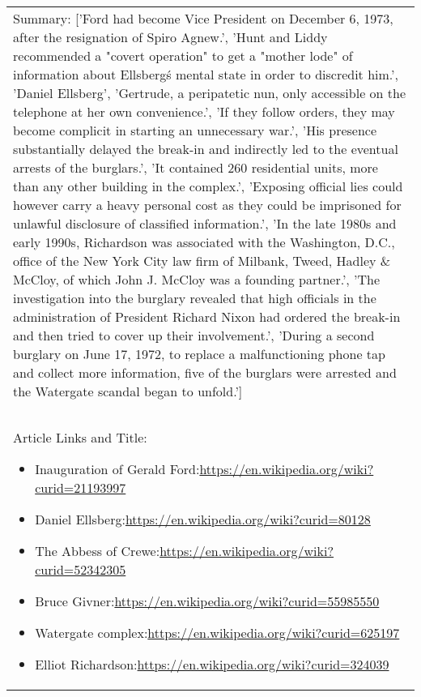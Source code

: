 \begin{table}[h]
\begin{tabular}{ Y }
    Summary: ['Ford had become Vice President on December 6, 1973, after the resignation of Spiro Agnew.', 'Hunt and Liddy recommended a "covert operation" to get a "mother lode" of information about Ellsberg\'s mental state in order to discredit him.', 'Daniel Ellsberg', 'Gertrude, a peripatetic nun, only accessible on the telephone at her own convenience.', 'If they follow orders, they may become complicit in starting an unnecessary war.', 'His presence substantially delayed the break-in and indirectly led to the eventual arrests of the burglars.', 'It contained 260 residential units, more than any other building in the complex.', 'Exposing official lies could however carry a heavy personal cost as they could be imprisoned for unlawful disclosure of classified information.', 'In the late 1980s and early 1990s, Richardson was associated with the Washington, D.C., office of the New York City law firm of Milbank, Tweed, Hadley \& McCloy, of which John J. McCloy was a founding partner.', 'The investigation into the burglary revealed that high officials in the administration of President Richard Nixon had ordered the break-in and then tried to cover up their involvement.', 'During a second burglary on June 17, 1972, to replace a malfunctioning phone tap and collect more information, five of the burglars were arrested and the Watergate scandal began to unfold.']\Tstrut\Bstrut\\ \\ \hline \\ 
    Article Links and Title: \begin{itemize}
        \itemsep0em 
        \item Inauguration of Gerald Ford:\url{https://en.wikipedia.org/wiki?curid=21193997} 
        \item Daniel Ellsberg:\url{https://en.wikipedia.org/wiki?curid=80128}
        \item The Abbess of Crewe:\url{https://en.wikipedia.org/wiki?curid=52342305} 
        \item Bruce Givner:\url{https://en.wikipedia.org/wiki?curid=55985550} 
        \item Watergate complex:\url{https://en.wikipedia.org/wiki?curid=625197} 
        \item Elliot Richardson:\url{https://en.wikipedia.org/wiki?curid=324039} 
    \end{itemize}\Tstrut\Bstrut\\\hline
    \end{tabular}
\end{table}
\justify

